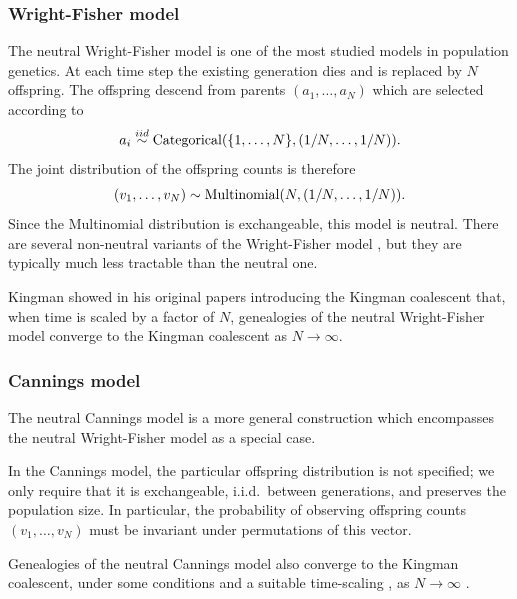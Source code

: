 \subsubsection{Wright-Fisher model}
The neutral Wright-Fisher model \parencite{fisher1923, fisher1930, wright1931} is one of the most studied models in population genetics.
At each time step the existing generation dies and is replaced by $N$ offspring. The offspring descend from parents $(a_1, \dots, a_N)$ which are selected according to
\begin{equation*}
a_i \overset{iid}{\sim} \operatorname{Categorical}(\{1, \dots, N\}, (1/N, \dots, 1/N)).
\end{equation*}
The joint distribution of the offspring counts is therefore
\begin{equation*}
(v_1,\dots, v_N) \sim \operatorname{Multinomial}(N, (1/N, \dots, 1/N)).
\end{equation*}
Since the Multinomial distribution is exchangeable, this model is neutral.
There are several non-neutral variants of the Wright-Fisher model , but they are typically much less tractable than the neutral one.

Kingman showed in his original papers introducing the Kingman coalescent \parencite{kingman1982gene} that, when time is scaled by a factor of $N$, genealogies of the neutral Wright-Fisher model converge to the Kingman coalescent as $N\to\infty$.

\subsubsection{Cannings model}
The neutral Cannings model \parencite{cannings1974, cannings1975} is a more general construction which encompasses the neutral Wright-Fisher model as a special case.

In the Cannings model, the particular offspring distribution is not specified; we only require that it is exchangeable, i.i.d.\ between generations, and preserves the population size. In particular, the probability of observing offspring counts $(v_1, \dots, v_N)$ must be invariant under permutations of this vector.

Genealogies of the neutral Cannings model also converge to the Kingman coalescent, under some conditions and a suitable time-scaling , as $N\to\infty$ \parencite[see for example][Section 2.2]{etheridge2011}. 


